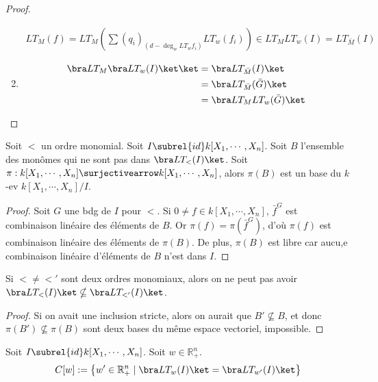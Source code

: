 \begin{proof}
\begin{enumerate}
\begin{align*}
                    LT_M(f) = LT_M \left( \sum (q_i)_{(d - \deg_w LT_w f_i)} LT_w(f_i) \right) \in LT_M LT_w(I) = LT_{\bar M}(I)
                \end{align*}
                \item
                \begin{align*}
                    \bra LT_M \bra LT_w(I) \ket \ket &= \bra LT_{\bar M}(I) \ket \\
                    &= \bra LT_{\bar M}(\bar G) \ket \\
                    &= \bra LT_M LT_w(\bar G) \ket
                \end{align*}
            \end{enumerate}
        \end{proof}
        \begin{prop}
            Soit $<$ un ordre monomial. Soit $I \subrel{id} k[X_1, \cdots, X_n]$. Soit $B$ l'ensemble des monômes qui ne sont pas dans $\bra LT_<(I) \ket$. Soit $\pi : k[X_1, \cdots, X_n] \surjectivearrow k[X_1, \cdots, X_n]$, alors $\pi(B)$ est un base du $k$-ev $k[X_1, \cdots, X_n]/I$.
        \end{prop}
        \begin{proof}
            Soit $G$ une bdg de $I$ pour $<$. Si $0 \neq f \in k[X_1, \cdots, X_n]$, $\bar f^G$ est combinaison linéaire des éléments de $B$. Or $\pi(f) = \pi(\bar f^G)$, d'où $\pi(f)$ est combinaison linéaire des éléments de $\pi(B)$. De plus, $\pi(B)$ est libre car aucu,e combinaison linéaire d'éléments de $B$ n'est dans $I$.
        \end{proof}
        \begin{coro}
            Si $< \neq <'$ sont deux ordres monomiaux, alors on ne peut pas avoir $\bra LT_<(I) \ket \nsubseteq \bra LT_{<'}(I) \ket$.
        \end{coro}
        \begin{proof}
            Si on avait une inclusion stricte, alors on aurait que $B' \nsubseteq B$, et donc $\pi(B') \nsubseteq \pi(B)$ sont deux bases du même espace vectoriel, impossible.
        \end{proof}
        \begin{defi}
            Soit $I \subrel{id} k[X_1, \cdots, X_n]$. Soit $w \in \mathbb{R}_+^n$.
            \begin{align}
                C[w] := \left\{ w' \in \mathbb{R}_+^n \mid \bra LT_w(I) \ket = \bra LT_{w'}(I) \ket \right\}
            \end{align}
        \end{defi}
